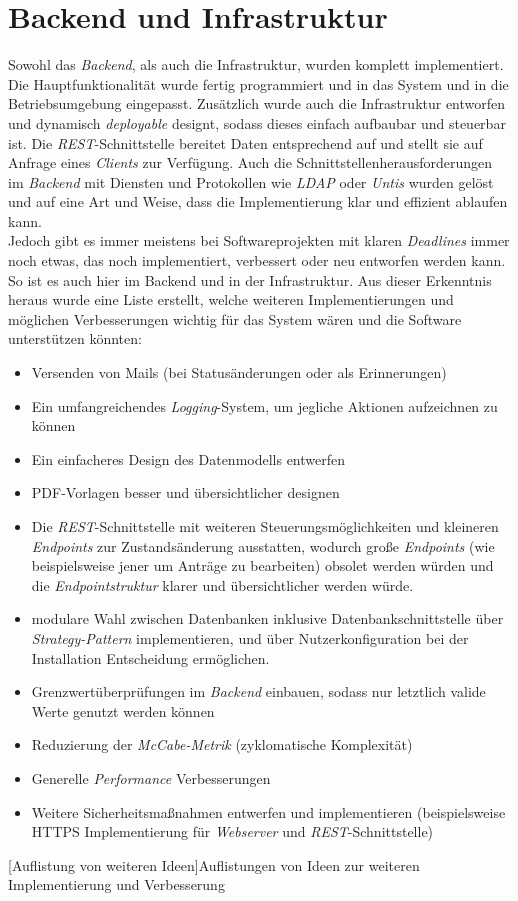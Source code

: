 \newpage

\section{Backend und Infrastruktur}

Sowohl das \textit{Backend}, als auch die Infrastruktur, wurden komplett implementiert. Die Hauptfunktionalität wurde fertig programmiert und in das System und in die Betriebsumgebung eingepasst. Zusätzlich wurde auch die Infrastruktur entworfen und dynamisch \textit{deployable} designt, sodass dieses einfach aufbaubar und steuerbar ist. Die \textit{REST}-Schnittstelle bereitet Daten entsprechend auf und stellt sie auf Anfrage eines \textit{Clients} zur Verfügung. Auch die Schnittstellenherausforderungen im \textit{Backend} mit Diensten und Protokollen wie \textit{LDAP} oder \textit{Untis} wurden gelöst und auf eine Art und Weise, dass die Implementierung klar und effizient ablaufen kann.\\

Jedoch gibt es immer meistens bei Softwareprojekten mit klaren \textit{Deadlines} immer noch etwas, das noch implementiert, verbessert oder neu entworfen werden kann. So ist es auch hier im Backend und in der Infrastruktur. Aus dieser Erkenntnis heraus wurde eine Liste erstellt, welche weiteren Implementierungen und möglichen Verbesserungen wichtig für das System wären und die Software unterstützen könnten:

\begin{itemize}
	\item Versenden von Mails (bei Statusänderungen oder als Erinnerungen)
	\item Ein umfangreichendes \textit{Logging}-System, um jegliche Aktionen aufzeichnen zu können
	\item Ein einfacheres Design des Datenmodells entwerfen
	\item PDF-Vorlagen besser und übersichtlicher designen
	\item Die \textit{REST}-Schnittstelle mit weiteren Steuerungsmöglichkeiten und kleineren \textit{Endpoints} zur Zustandsänderung ausstatten, wodurch große \textit{Endpoints} (wie beispielsweise jener um Anträge zu bearbeiten) obsolet werden würden und die \textit{Endpointstruktur} klarer und übersichtlicher werden würde.
	\item modulare Wahl zwischen Datenbanken inklusive Datenbankschnittstelle über \textit{Strategy-Pattern} implementieren, und über Nutzerkonfiguration bei der Installation Entscheidung ermöglichen.
	\item Grenzwertüberprüfungen im \textit{Backend} einbauen, sodass nur letztlich valide Werte genutzt werden können
	\item Reduzierung der \textit{McCabe-Metrik} (zyklomatische Komplexität)
	\item Generelle \textit{Performance} Verbesserungen
	\item Weitere Sicherheitsmaßnahmen entwerfen und implementieren (beispielsweise HTTPS Implementierung für \textit{Webserver} und \textit{REST}-Schnittstelle)
\end{itemize}
[Auflistung von weiteren Ideen]{Auflistungen von Ideen zur weiteren Implementierung und Verbesserung}
\newpage
